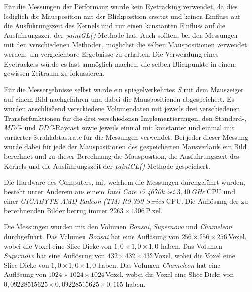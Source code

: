 Für die Messungen der Performanz wurde kein Eyetracking verwendet, da dies lediglich die Mausposition mit der Blickposition ersetzt und keinen Einfluss auf die Ausführungszeit des Kernels und nur einen konstanten Einfluss auf die Ausführungszeit der \emph{paintGL()}-Methode hat.
Auch sollten, bei den Messungen mit den verschiedenen Methoden, möglichst die selben Mauspositionen verwendet werden, um vergleichbare Ergebnisse zu erhalten.
Die Verwendung eines Eyetrackers würde es fast unmöglich machen, die selben Blickpunkte in einem gewissen Zeitraum zu fokussieren.

Für die Messergebnisse selbst wurde ein spiegelverkehrtes \emph{S} mit dem Mauszeiger auf einem Bild nachgefahren und dabei die Mauspositionen abgespeichert.
Es wurden anschließend verschiedene Volumendaten mit jeweils drei verschiedenen Transferfunktionen für die drei verschiedenen Implementierungen, den Standard-, \emph{MDC}- und \emph{DDC}-Raycast sowie jeweils einmal mit konstanter und einmal mit variierter Strahlabtastrate für die Messungen verwendet.
Bei jeder dieser Messung wurde dabei für jede der Mauspositionen des gespeicherten Mausverlaufs ein Bild berechnet und zu dieser Berechnung die Mausposition, die Ausführungszeit des Kernels und die Ausführungszeit der \emph{paintGL()}-Methode gespeichert.

Die Hardware des Computers, mit welchem die Messungen durchgeführt wurden, besteht unter Anderem aus einem \emph{Intel Core i5 4670k bei $3,40$\,GHz} CPU und einer \emph{GIGABYTE AMD Radeon (TM) R9 390 Series} GPU.
Die Auflösung der zu berechnenden Bilder betrug immer $2263\times1306$\,Pixel.

Die Messungen wurden mit den Volumen \emph{Bonsai}, \emph{Supernova} und \emph{Chameleon} durchgeführt.
Das Volumen \emph{Bonsai} hat eine Auflösung von $256\times256\times256$\,Voxel, wobei die Voxel eine Slice-Dicke von $1,0\times1,0\times1,0$ haben.
Das Volumen \emph{Supernova} hat eine Auflösung von $432\times432\times432$\,Voxel, wobei die Voxel eine Slice-Dicke von $1,0\times1,0\times1,0$ haben.
Das Volumen \emph{Chameleon} hat eine Auflösung von $1024\times1024\times1024$\,Voxel, wobei die Voxel eine Slice-Dicke von $0,09228515625\times0,09228515625\times0,105$ haben.

